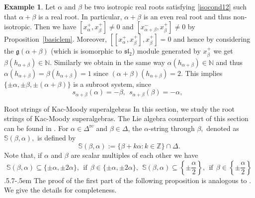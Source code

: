 \documentclass[11pt,reqno]{amsart}
\makeatletter
\theoremstyle{plain}
\theoremstyle{definition}
\newtheorem*{example}{Example}
\theoremstyle{remark}
\newcommand{\lie}[1]{\mathfrak{#1}}
\numberwithin{equation}{section}
\def\section{\def\@secnumfont{\mdseries}\@startsection{section}{1}%
  \z@{.7\linespacing\@plus\linespacing}{.5\linespacing}%
  {\normalfont\scshape\centering}}
\def\subsection{\def\@secnumfont{\bfseries}\@startsection{subsection}{2}%
  {\parindent}{.5\linespacing\@plus.7\linespacing}{-.5em}%
  {\normalfont\bfseries}}
\makeatother
\begin{document}
\begin{example}
    Let $\alpha$ and $\beta$ be two isotropic real roots satisfying \eqref{isocond12} such that $\alpha+\beta$ is a real root. In particular, $\alpha+\beta$ is an even real root and thus non-isotropic. Then we have $[x^+_\alpha,x^+_\beta]\neq 0$ and $[x^-_{\alpha+\beta},x^+_\beta]\neq 0$ by Proposition~\ref{basiclem}. Moreover, $[[x^+_\alpha,x^+_\beta],x^+_\beta]=0$ and hence by considering the $\lie g(\alpha+\beta)$ (which is isomorphic to $\mathfrak{sl}_2$) module generated by $x^+_\beta$ we get $\beta(h_{\alpha+\beta})\in \mathbb{N}$. Similarly we obtain in the same way $\alpha(h_{\alpha+\beta})\in \mathbb{N}$ and thus 
$\alpha(h_{\alpha+\beta})=\beta(h_{\alpha+\beta})=1$ since $(\alpha+\beta)(h_{\alpha+\beta})=2$. This implies $\{\pm \alpha,\pm \beta, \pm (\alpha+\beta)\}$ is a subroot system, since
$$s_{\alpha+\beta}(\alpha)=-\beta,\ \ s_{\alpha+\beta}(\beta)=-\alpha,\ \ $$
\end{example} 

\section{Root strings of Kac-Moody superalgebras}\label{secrootstring}
In this section, we study the root strings of Kac-Moody superalgebras. The Lie algebra counterpart of this section can be found in \cite{billig1995root,morita1988root}. For $\alpha\in\Delta^{\mathrm{re}}$ and $\beta\in\Delta$, the $\alpha$-string through $\beta,$ denoted as $\mathbb{S}(\beta,\alpha),$ is defined by $$\mathbb{S}(\beta,\alpha):=\{\beta+k\alpha:k\in\mathbb{Z}\}\cap\Delta.$$
Note that, if $\alpha$ and $\beta$ are scalar multiples of each other we have
\begin{equation}\label{scalarmultiple}\mathbb{S}(\beta,\alpha)\subseteq \{\pm \alpha, \pm 2\alpha\},\ \ \text{if}\ \ \beta\in\{\pm\alpha,\pm 2\alpha\}, \ \ \mathbb{S}(\beta,\alpha)\subseteq \left\{\pm \frac{\alpha}{2}\right\},\ \ \text{if} \ \ \beta\in\left\{\pm\frac{\alpha}{2}\right\}\end{equation}
\subsection{} The proof of the first part of the following proposition is analogous to \cite[Proposition 5.1]{Kac90Infinite}. We give the details for completeness.
\end{document}
